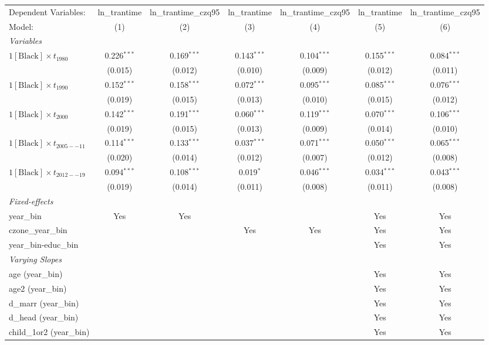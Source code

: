 \begin{tabular}{lcccccc}
\tabularnewline\midrule\midrule
Dependent Variables:&ln\_trantime&ln\_trantime\_czq95&ln\_trantime&ln\_trantime\_czq95&ln\_trantime&ln\_trantime\_czq95\\
Model:&(1) & (2) & (3) & (4) & (5) & (6)\\
\midrule \emph{Variables}&   &   &   &   &   &  \\
$1[\text{Black}] \times t_{1980}$ & 0.226$^{***}$ & 0.169$^{***}$ & 0.143$^{***}$ & 0.104$^{***}$ & 0.155$^{***}$ & 0.084$^{***}$\\
  &(0.015) & (0.012) & (0.010) & (0.009) & (0.012) & (0.011)\\
$1[\text{Black}] \times t_{1990}$ & 0.152$^{***}$ & 0.158$^{***}$ & 0.072$^{***}$ & 0.095$^{***}$ & 0.085$^{***}$ & 0.076$^{***}$\\
  &(0.019) & (0.015) & (0.013) & (0.010) & (0.015) & (0.012)\\
$1[\text{Black}] \times t_{2000}$ & 0.142$^{***}$ & 0.191$^{***}$ & 0.060$^{***}$ & 0.119$^{***}$ & 0.070$^{***}$ & 0.106$^{***}$\\
  &(0.019) & (0.015) & (0.013) & (0.009) & (0.014) & (0.010)\\
$1[\text{Black}] \times t_{2005--11}$ & 0.114$^{***}$ & 0.133$^{***}$ & 0.037$^{***}$ & 0.071$^{***}$ & 0.050$^{***}$ & 0.065$^{***}$\\
  &(0.020) & (0.014) & (0.012) & (0.007) & (0.012) & (0.008)\\
$1[\text{Black}] \times t_{2012--19}$ & 0.094$^{***}$ & 0.108$^{***}$ & 0.019$^{*}$ & 0.046$^{***}$ & 0.034$^{***}$ & 0.043$^{***}$\\
  &(0.019) & (0.014) & (0.011) & (0.008) & (0.011) & (0.008)\\
\midrule \emph{Fixed-effects}&   &   &   &   &   &  \\
year\_bin & Yes & Yes &  &  & Yes & Yes\\
czone\_year\_bin &  &  & Yes & Yes & Yes & Yes\\
year\_bin-educ\_bin &  &  &  &  & Yes & Yes\\
\midrule \emph{Varying Slopes}&   &   &   &   &   &  \\
age (year\_bin) &  &  &  &  & Yes & Yes\\
age2 (year\_bin) &  &  &  &  & Yes & Yes\\
d\_marr (year\_bin) &  &  &  &  & Yes & Yes\\
d\_head (year\_bin) &  &  &  &  & Yes & Yes\\
child\_1or2 (year\_bin) &  &  &  &  & Yes & Yes\\

\end{tabular}
